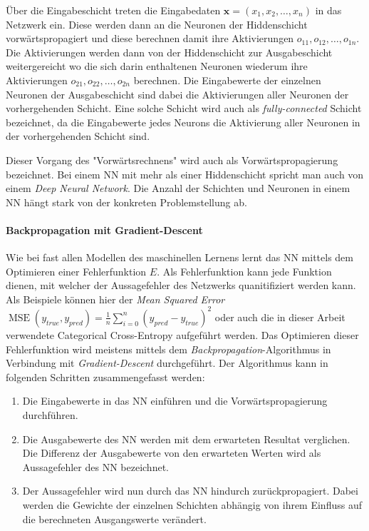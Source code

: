 Über die Eingabeschicht treten die Eingabedaten $\mathbf{x} = (x_1, x_2, \dots, x_n)$ in das Netzwerk ein. Diese werden dann an die Neuronen der Hiddenschicht vorwärtspropagiert und diese berechnen damit ihre Aktivierungen $o_{11}, o_{12}, \dots, o_{1n}$. Die Aktivierungen werden dann von der Hiddenschicht zur Ausgabeschicht weitergereicht wo die sich darin enthaltenen Neuronen wiederum ihre Aktivierungen $o_{21}, o_{22}, \dots, o_{2n}$ berechnen. Die Eingabewerte der einzelnen Neuronen der Ausgabeschicht sind dabei die Aktivierungen aller Neuronen der vorhergehenden Schicht. Eine solche Schicht wird auch als \emph{fully-connected} Schicht bezeichnet, da die Eingabewerte jedes Neurons die Aktivierung aller Neuronen in der vorhergehenden Schicht sind.

Dieser Vorgang des "Vorwärtsrechnens" wird auch als Vorwärtspropagierung bezeichnet. Bei einem NN mit mehr als einer Hiddenschicht spricht man auch von einem \emph{Deep Neural Network}. Die Anzahl der Schichten und Neuronen in einem NN hängt stark von der konkreten Problemstellung ab.

\paragraph{Backpropagation mit Gradient-Descent} Wie bei fast allen Modellen des maschinellen Lernens lernt das NN mittels dem Optimieren einer Fehlerfunktion $E$. Als Fehlerfunktion kann jede Funktion dienen, mit welcher der Aussagefehler des Netzwerks quanitifiziert werden kann. Als Beispiele können hier der \emph{Mean Squared Error} $\operatorname{MSE}(y_{true}, y_{pred}) = \frac{1}{n}\sum_{i=0}^{n} (y_{pred} - y_{true})^2$ oder auch die in dieser Arbeit verwendete Categorical Cross-Entropy  aufgeführt werden. Das Optimieren dieser Fehlerfunktion wird meistens mittels dem \emph{Backpropagation}-Algorithmus in Verbindung mit \emph{Gradient-Descent} durchgeführt. Der Algorithmus kann in folgenden Schritten zusammengefasst werden:

\begin{enumerate}
  \item Die Eingabewerte in das NN einführen und die Vorwärtspropagierung durchführen.
  \item Die Ausgabewerte des NN werden mit dem erwarteten Resultat verglichen. Die Differenz der Ausgabewerte von den erwarteten Werten wird als Aussagefehler des NN bezeichnet.
  \item Der Aussagefehler wird nun durch das NN hindurch zurückpropagiert. Dabei werden die Gewichte der einzelnen Schichten abhängig von ihrem Einfluss auf die berechneten Ausgangswerte verändert.
\end{enumerate}

